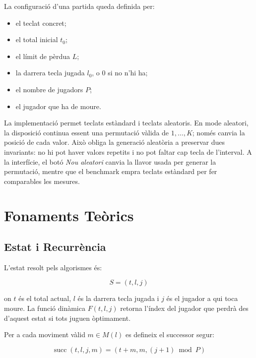 \documentclass[conference,compsoc]{IEEEtran}
\begin{document}
La configuració d'una partida queda definida per:

\begin{itemize}
    \item el teclat concret;
    \item el total inicial $t_0$;
    \item el límit de pèrdua $L$;
    \item la darrera tecla jugada $l_0$, o $0$ si no n'hi ha;
    \item el nombre de jugadors $P$;
    \item el jugador que ha de moure.
\end{itemize}

La implementació permet teclats estàndard i teclats aleatoris. En mode aleatori,
la disposició continua essent una permutació vàlida de $1,\ldots,K$; només canvia
la posició de cada valor. Això obliga la generació aleatòria a preservar dues
invariants: no hi pot haver valors repetits i no pot faltar cap tecla de
l'interval. A la interfície, el botó \textit{Nou aleatori} canvia la llavor usada
per generar la permutació, mentre que el benchmark empra teclats estàndard per
fer comparables les mesures.

\section{Fonaments Teòrics}

\subsection{Estat i Recurrència}

L'estat resolt pels algorismes és:

\begin{equation}
S = (t, l, j)
\end{equation}

on $t$ és el total actual, $l$ és la darrera tecla jugada i $j$ és el jugador a
qui toca moure. La funció dinàmica $F(t,l,j)$ retorna l'índex del jugador que
perdrà des d'aquest estat si tots juguen òptimament.

Per a cada moviment vàlid $m \in M(l)$ es defineix el successor segur:

\begin{equation}
\operatorname{succ}(t,l,j,m) = (t+m, m, (j+1) \bmod P)
\end{equation}
\end{document}
